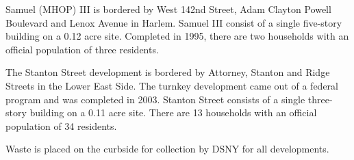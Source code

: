 Samuel (MHOP) III is bordered by West 142nd Street, Adam Clayton Powell Boulevard and Lenox Avenue in Harlem. Samuel III consist of a single five-story building  on a 0.12 acre site. Completed in 1995, there are two households with an official population of three residents.

The Stanton Street development is bordered by Attorney, Stanton and Ridge Streets in the Lower East Side. The turnkey development came out of a federal program and was completed in 2003. Stanton Street consists of a single three-story building on a 0.11 acre site. There are 13 households with an official population of 34 residents.

Waste is placed on the curbside for collection by DSNY for all developments. 